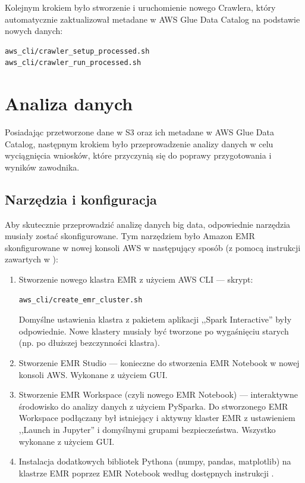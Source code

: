 \documentclass[12pt, a4paper]{article}
\begin{document}
Kolejnym krokiem było stworzenie i uruchomienie nowego Crawlera, który automatycznie zaktualizował metadane w AWS Glue Data Catalog na podstawie nowych danych:
\begin{verbatim}
aws_cli/crawler_setup_processed.sh
aws_cli/crawler_run_processed.sh
\end{verbatim}


\section{Analiza danych}
Posiadając przetworzone dane w S3 oraz ich metadane w AWS Glue Data Catalog, następnym krokiem było przeprowadzenie analizy danych w celu wyciągnięcia wniosków, które przyczynią się do poprawy przygotowania i wyników zawodnika. 

\subsection{Narzędzia i konfiguracja}
Aby skutecznie przeprowadzić analizę danych big data, odpowiednie narzędzia musiały zostać skonfigurowane. Tym narzędziem było Amazon EMR skonfigurowane w nowej konsoli AWS w następujący sposób (z pomocą instrukcji zawartych w \cite{aws_emr_setup}):
\begin{enumerate}
    \item Stworzenie nowego klastra EMR z użyciem AWS CLI --- skrypt:
\begin{verbatim}
aws_cli/create_emr_cluster.sh
\end{verbatim}
    Domyślne ustawienia klastra z pakietem aplikacji ,,Spark Interactive'' były odpowiednie. Nowe klastery musiały być tworzone po wygaśnięciu starych (np. po dłuższej bezczynności klastra). 
    \item Stworzenie EMR Studio --- konieczne do stworzenia EMR Notebook w nowej konsoli AWS. Wykonane z użyciem GUI.
    \item Stworzenie EMR Workspace (czyli nowego EMR Notebook) --- interaktywne środowisko do analizy danych z użyciem PySparka. Do stworzonego EMR Workspace podłączany był istniejący i aktywny klaster EMR z ustawieniem ,,Launch in Jupyter'' i domyślnymi grupami bezpieczeństwa. Wszystko wykonane z użyciem GUI.
    \item Instalacja dodatkowych bibliotek Pythona (numpy, pandas, matplotlib) na klastrze EMR poprzez EMR Notebook według dostępnych instrukcji \cite{emr_python_libs}.
\end{enumerate}
\end{document}
